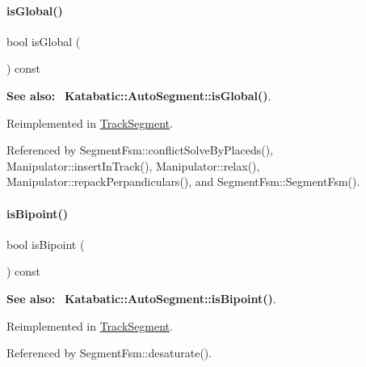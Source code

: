 \mbox{\label{classKite_1_1TrackElement_a19ba379112d6b29faa45c5eefbf38500}} 
\paragraph{\texorpdfstring{is\+Global()}{isGlobal()}}
{\footnotesize\ttfamily bool is\+Global (\begin{DoxyParamCaption}{ }\end{DoxyParamCaption}) const\hspace{0.3cm}{\ttfamily [virtual]}}

{\bfseries See also\+:}~ \textbf{ Katabatic\+::\+Auto\+Segment\+::is\+Global()}. 

Reimplemented in \hyperlink{classKite_1_1TrackSegment_a19ba379112d6b29faa45c5eefbf38500}{Track\+Segment}.



Referenced by Segment\+Fsm\+::conflict\+Solve\+By\+Placeds(), Manipulator\+::insert\+In\+Track(), Manipulator\+::relax(), Manipulator\+::repack\+Perpandiculars(), and Segment\+Fsm\+::\+Segment\+Fsm().

\mbox{\label{classKite_1_1TrackElement_a72741158d19af38e84c5e9c08f91270f}} 
\paragraph{\texorpdfstring{is\+Bipoint()}{isBipoint()}}
{\footnotesize\ttfamily bool is\+Bipoint (\begin{DoxyParamCaption}{ }\end{DoxyParamCaption}) const\hspace{0.3cm}{\ttfamily [virtual]}}

{\bfseries See also\+:}~ \textbf{ Katabatic\+::\+Auto\+Segment\+::is\+Bipoint()}. 

Reimplemented in \hyperlink{classKite_1_1TrackSegment_a72741158d19af38e84c5e9c08f91270f}{Track\+Segment}.



Referenced by Segment\+Fsm\+::desaturate().

